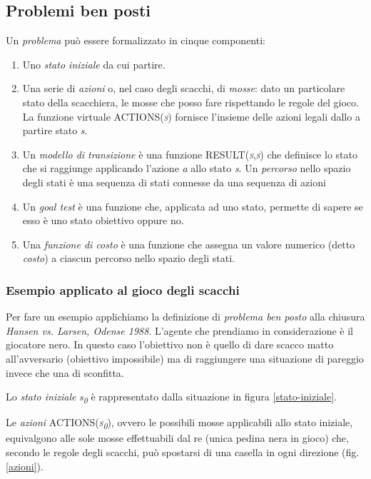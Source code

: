 \subsection{Problemi ben posti}
Un \emph{problema} può essere formalizzato in cinque componenti:
\begin{enumerate}
   \item Uno \emph{stato iniziale} da cui partire.
   \item Una serie di \emph{azioni} o, nel caso degli scacchi, di \emph{mosse}: dato un particolare stato della scacchiera, le mosse che posso fare rispettando le regole del gioco. La funzione virtuale \textsc{ACTIONS(\emph{s})} fornisce l'insieme delle azioni legali dallo a partire stato \emph{s}.
   \item Un \emph{modello di transizione} è una funzione \textsc{RESULT(\emph{s},\emph{s})} che definisce lo stato che si raggiunge applicando l'azione \emph{a} allo stato \emph{s}.
Un \emph{percorso} nello spazio degli stati è una sequenza di stati connesse da una sequenza di azioni
   \item Un \emph{goal test} è una funzione che, applicata ad uno stato, permette di sapere se esso è uno stato obiettivo oppure no.
   \item Una \emph{funzione di costo} è una funzione che assegna un valore numerico (detto \emph{costo}) a ciascun percorso nello spazio degli stati.
\end{enumerate}

\subsubsection*{Esempio applicato al gioco degli scacchi}
Per fare un esempio applichiamo la definizione di \emph{problema ben posto} alla chiusura \emph{Hansen vs. Larsen, Odense 1988}.
L'agente che prendiamo in considerazione è il giocatore nero.
In questo caso l'obiettivo non è quello di dare scacco matto all'avversario (obiettivo impossibile) ma di raggiungere una situazione di pareggio invece che una di sconfitta.

Lo \emph{stato iniziale} \emph{s\textsubscript{0}} è rappresentato dalla situazione in figura \ref{stato-iniziale}.

Le \emph{azioni} \textsc{ACTIONS(\emph{s\textsubscript{0}})}, ovvero le possibili mosse applicabili allo stato iniziale, equivalgono alle sole mosse effettuabili dal re (unica pedina nera in gioco) che, secondo le regole degli scacchi, può spostarsi di una casella in ogni direzione (fig. \ref{azioni}).

